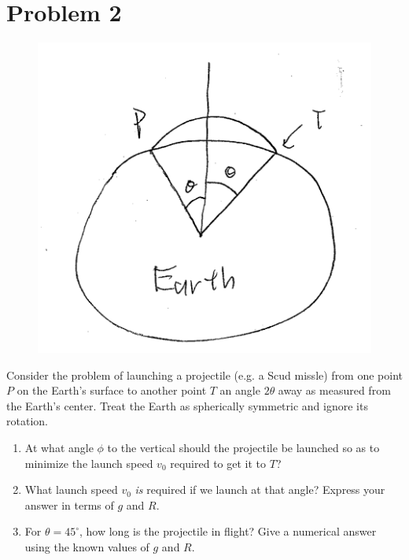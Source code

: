 \documentclass[12pt]{article}
\begin{document}
\section*{Problem 2}
\begin{figure}[H]
    \includegraphics{Problem2}
    \centering
\end{figure}
Consider the problem of launching a projectile (e.g. a Scud missle) from one point $P$ on the Earth's surface to another point $T$ an angle $2\theta$ away as measured from the Earth's center. Treat the Earth as spherically symmetric and ignore its rotation.
\begin{enumerate}[label=(\alph*)]
    \item At what angle $\phi$ to the vertical should the projectile be launched so as to minimize the launch speed $v_0$ required to get it to $T$?
    \item What launch speed $v_0$ \textit{is} required if we launch at that angle? Express your answer in terms of $g$ and $R$.
    \item For $\theta = 45^{\circ}$, how long is the projectile in flight? Give a numerical answer using the known values of $g$ and $R$.
\end{enumerate}
\end{document}
